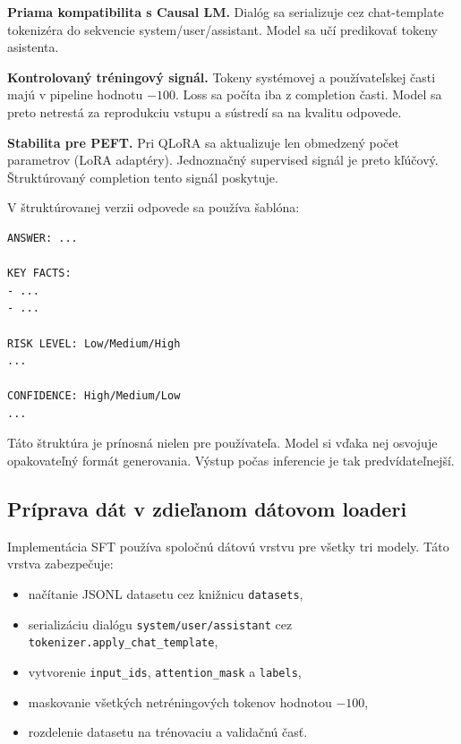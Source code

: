 \noindent\textbf{Priama kompatibilita s Causal LM.} Dialóg sa serializuje cez chat-template tokenizéra do sekvencie system/user/assistant. Model sa učí predikovať tokeny asistenta.\par\medskip
\noindent\textbf{Kontrolovaný tréningový signál.} Tokeny systémovej a používateľskej časti majú v pipeline hodnotu $-100$. Loss sa počíta iba z completion časti. Model sa preto netrestá za reprodukciu vstupu a sústredí sa na kvalitu odpovede.\par\medskip
\noindent\textbf{Stabilita pre PEFT.} Pri QLoRA sa aktualizuje len obmedzený počet parametrov (LoRA adaptéry). Jednoznačný supervised signál je preto kľúčový. Štruktúrovaný completion tento signál poskytuje.\par\medskip

V štruktúrovanej verzii odpovede sa používa šablóna:
\begin{verbatim}
ANSWER: ...

KEY FACTS:
- ...
- ...

RISK LEVEL: Low/Medium/High
...

CONFIDENCE: High/Medium/Low
...
\end{verbatim}

Táto štruktúra je prínosná nielen pre používateľa. Model si vďaka nej osvojuje opakovateľný formát generovania. Výstup počas inferencie je tak predvídateľnejší.

\subsection{Príprava dát v zdieľanom dátovom loaderi}

Implementácia SFT používa spoločnú dátovú vrstvu pre všetky tri modely. Táto vrstva zabezpečuje:
\begin{itemize}
    \item načítanie JSONL datasetu cez knižnicu \texttt{datasets},
    \item serializáciu dialógu \texttt{system/\allowbreak user/\allowbreak assistant} cez \texttt{tokenizer.\allowbreak apply\_chat\_\allowbreak template},
    \item vytvorenie \texttt{input\_ids}, \texttt{attention\_mask} a \texttt{labels},
    \item maskovanie všetkých netréningových tokenov hodnotou $-100$,
    \item rozdelenie datasetu na trénovaciu a validačnú časť.
\end{itemize}

